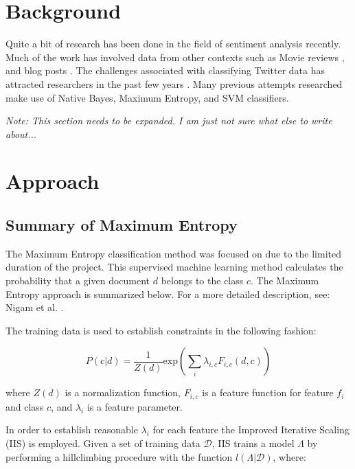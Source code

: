 \documentclass[final,3p,12pt]{elsarticle}
\begin{document}
\section{Background}

Quite a bit of research has been done in the field of sentiment analysis
recently. Much of the work has involved data from other contexts such as Movie
reviews \cite{Pang2002}, and blog posts \cite{Melville2009}. The challenges
associated with classifying Twitter data has attracted researchers in the past
few years \cite{Jianfeng2013} \cite{Barbosa2010} \cite{Gokulakrishnan2012}.
Many previous attempts researched make use of Native Bayes, Maximum Entropy,
and SVM classifiers.

\textit{Note: This section needs to be expanded. I am just not sure what else to write about...}


\section{Approach}

\subsection{Summary of Maximum Entropy}

The Maximum Entropy classification method was focused on due to the limited
duration of the project. This supervised machine learning method calculates the
probability that a given document $d$ belongs to the class $c$.  The Maximum
Entropy approach is summarized below. For a more detailed description, see:
Nigam et al. \cite{Nigam1999}.

The training data is used to establish constraints in the following fashion:

\begin{equation}
    P(c | d) = \frac{1}{Z(d)} \mathrm{exp}(\sum\limits_{i} \lambda _{i,c} F_{i,c}(d,c) )
\end{equation}

where $Z(d)$ is a normalization function, $F_{i,c}$ is a feature function for
feature $f_{i}$ and class $c$, and $\lambda_{i}$ is a feature parameter.

In order to establish reasonable $\lambda_{i}$ for each feature the Improved
Iterative Scaling (IIS) is employed. Given a set of training data
$\mathcal{D}$, IIS trains a model $\Lambda$ by performing a hillclimbing
procedure with the function $l(\Lambda|\mathcal{D})$, where:
\end{document}
